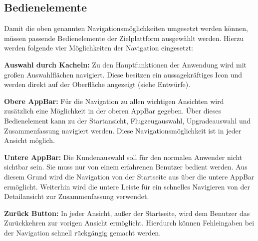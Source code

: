 \subsection{Bedienelemente}
Damit die oben genannten Navigationsmöglichkeiten umgesetzt werden können, müssen passende Bedienelemente der Zielplattform ausgewählt werden. Hierzu werden folgende vier Möglichkeiten der Navigation eingesetzt: \par

\textbf{Auswahl durch Kacheln:} Zu den Hauptfunktionen der Anwendung wird mit großen Auswahlflächen navigiert. Diese besitzen ein aussagekräftiges Icon und werden direkt auf der Oberfläche angezeigt (siehe Entwürfe).  

\textbf{Obere AppBar:} Für die Navigation zu allen wichtigen Ansichten wird zusätzlich eine Möglichkeit in der oberen AppBar gegeben. Über dieses Bedienelement kann zu der Startansicht, Flugzeugauswahl, Upgradeauswahl und Zusammenfassung navigiert werden. Diese Navigationsmöglichkeit ist in jeder Ansicht möglich.

\textbf{Untere AppBar:} Die Kundenauswahl soll für den normalen Anwender nicht sichtbar sein. Sie muss nur von einem erfahrenen Benutzer bedient werden. Aus diesem Grund wird die Navigation von der Startseite aus über die untere AppBar ermöglicht. Weiterhin wird die untere Leiste für ein schnelles Navigieren von der Detailansicht zur Zusammenfassung verwendet. 

\textbf{Zurück Button:} In jeder Ansicht, außer der Startseite, wird dem Benutzer das Zurückkehren zur vorigen Ansicht ermöglicht. Hierdurch können Fehleingaben bei der Navigation schnell rückgängig gemacht werden.